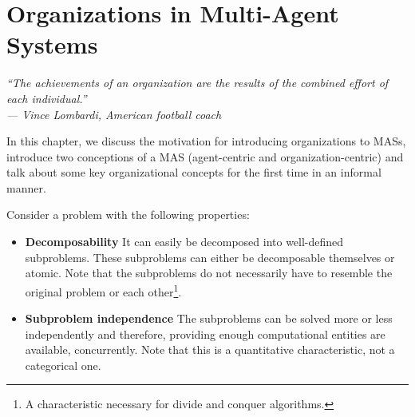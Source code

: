 
\chapter{Organizations in Multi-Agent Systems}

\begin{flushright}
\textit{``The achievements of an organization are the results of the combined effort of each individual.''}\\
\textit{--- Vince Lombardi, American football coach}
\end{flushright}

In this chapter, we discuss the motivation for introducing organizations to MASs, introduce two conceptions of a MAS (agent-centric and organization-centric) and talk about some key organizational concepts for the first time in an informal manner.

Consider a problem with the following properties:
\begin{itemize}
	\item \textbf{Decomposability} It can easily be decomposed into well-defined subproblems. These subproblems can either be decomposable themselves or atomic.
	Note that the subproblems do not necessarily have to resemble the original problem or each other\footnote{A characteristic necessary for divide and conquer algorithms.}. 
	\item \textbf{Subproblem independence} The subproblems can be solved more or less independently and therefore, providing enough computational entities are available, concurrently.
	Note that this is a quantitative characteristic, not a categorical one.
\end{itemize}

